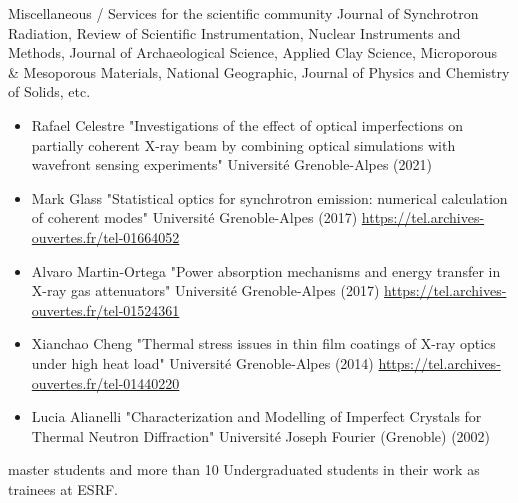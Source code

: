 \begin{rubric}{Miscellaneous / Services for the scientific community}
\entry*[] Journal of Synchrotron Radiation, Review of Scientific Instrumentation, Nuclear Instruments and Methods,  Journal of Archaeological Science, Applied Clay Science, Microporous \& Mesoporous Materials, National Geographic, Journal of Physics and Chemistry of Solids, etc.

\entry*[Ph.D.] 
\begin{itemize}

\item Rafael Celestre "Investigations of the effect of optical imperfections on partially coherent X-ray beam by combining optical simulations with wavefront sensing experiments" Universit\'e Grenoble-Alpes (2021)
\item Mark Glass "Statistical optics for synchrotron emission: numerical calculation of coherent modes" Universit\'e Grenoble-Alpes (2017) \url{https://tel.archives-ouvertes.fr/tel-01664052}
\item Alvaro Martin-Ortega "Power absorption mechanisms and energy transfer in X-ray gas attenuators" Universit\'e Grenoble-Alpes (2017) \url{https://tel.archives-ouvertes.fr/tel-01524361}
\item Xianchao Cheng "Thermal stress issues in thin film coatings of X-ray optics under high heat load" Universit\'e Grenoble-Alpes (2014) \url{https://tel.archives-ouvertes.fr/tel-01440220}
\item Lucia Alianelli "Characterization and Modelling of
Imperfect Crystals for Thermal Neutron Diffraction" Universit\'e Joseph Fourier (Grenoble) (2002)
\end{itemize}

 master students
and more than 10 Undergraduated students in their work as trainees at ESRF. 


\end{rubric}

